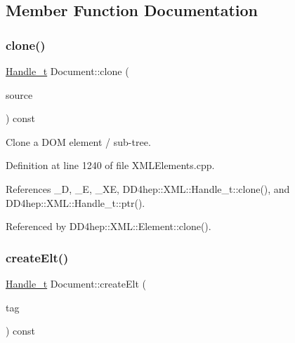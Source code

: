 \subsection{Member Function Documentation}
\hypertarget{class_d_d4hep_1_1_x_m_l_1_1_document_a47d813664ed46e4b7e718cba9d6c02da}{}\label{class_d_d4hep_1_1_x_m_l_1_1_document_a47d813664ed46e4b7e718cba9d6c02da} 
\subsubsection{\texorpdfstring{clone()}{clone()}}
{\footnotesize\ttfamily \hyperlink{class_d_d4hep_1_1_x_m_l_1_1_handle__t}{Handle\+\_\+t} Document\+::clone (\begin{DoxyParamCaption}\item[{\hyperlink{class_d_d4hep_1_1_x_m_l_1_1_handle__t}{Handle\+\_\+t}}]{source }\end{DoxyParamCaption}) const}



Clone a D\+OM element / sub-\/tree. 



Definition at line 1240 of file X\+M\+L\+Elements.\+cpp.



References \+\_\+D, \+\_\+E, \+\_\+\+XE, D\+D4hep\+::\+X\+M\+L\+::\+Handle\+\_\+t\+::clone(), and D\+D4hep\+::\+X\+M\+L\+::\+Handle\+\_\+t\+::ptr().



Referenced by D\+D4hep\+::\+X\+M\+L\+::\+Element\+::clone().

\hypertarget{class_d_d4hep_1_1_x_m_l_1_1_document_a9d178bf5ff49794334d416d98e09ffc1}{}\label{class_d_d4hep_1_1_x_m_l_1_1_document_a9d178bf5ff49794334d416d98e09ffc1} 
\subsubsection{\texorpdfstring{create\+Elt()}{createElt()}}
{\footnotesize\ttfamily \hyperlink{class_d_d4hep_1_1_x_m_l_1_1_handle__t}{Handle\+\_\+t} Document\+::create\+Elt (\begin{DoxyParamCaption}\item[{const \hyperlink{namespace_d_d4hep_1_1_x_m_l_a09e5d9cc86ed782f6826dfe0778c1815}{Xml\+Char} $\ast$}]{tag }\end{DoxyParamCaption}) const}



